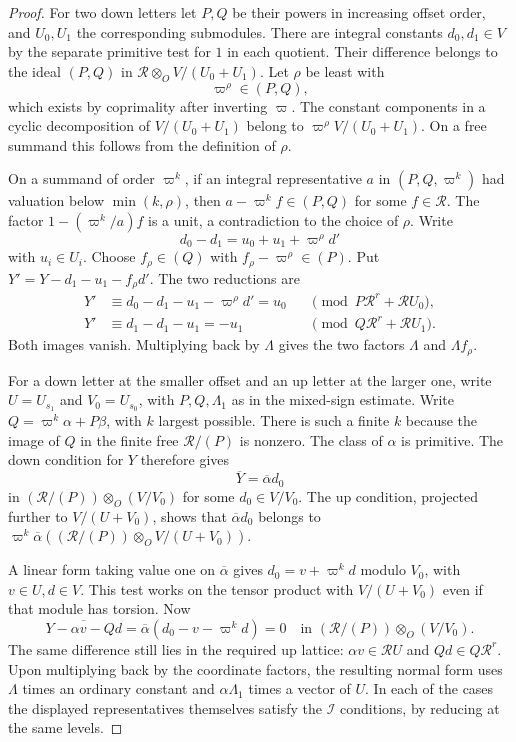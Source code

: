 \begin{proof}
For two down letters let \(P,Q\) be their powers in increasing
offset order, and \(U_0,U_1\) the corresponding submodules.
There are integral constants \(d_0,d_1\in V\) by the separate
primitive test for \(1\) in each quotient. Their difference
belongs to the ideal \((P,Q)\) in
\(\mathcal R\otimes_O V/(U_0+U_1)\). Let \(\rho\) be least with
\[
 \varpi^\rho\in(P,Q),
\]
which exists by coprimality after
inverting \(\varpi\). The constant components in a cyclic
decomposition of \(V/(U_0+U_1)\) belong to
\(\varpi^\rho V/(U_0+U_1)\). On a free summand this follows
from the definition of \(\rho\).

On a summand of order
\(\varpi^k\), if an integral representative \(a\) in
\((P,Q,\varpi^k)\) had valuation below \(\min(k,\rho)\), then
\(a-\varpi^k f\in(P,Q)\) for some \(f\in\mathcal R\).
The factor \(1-(\varpi^k/a)f\) is a unit, a contradiction
to the choice of \(\rho\).
Write
\[
 d_0-d_1=u_0+u_1+\varpi^\rho d'
\]
with
\(u_i\in U_i\). Choose \(f_\rho\in(Q)\) with
\(f_\rho-\varpi^\rho\in(P)\). Put \(Y'=Y-d_1-u_1-f_\rho d'\).
The two reductions are
\[
 \begin{aligned}
  Y'&\equiv d_0-d_1-u_1-\varpi^\rho d'=u_0
        &&\pmod {P\mathcal R^r+\mathcal R U_0},\\
  Y'&\equiv d_1-d_1-u_1=-u_1
        &&\pmod {Q\mathcal R^r+\mathcal R U_1}.
 \end{aligned}
\]
Both images vanish. Multiplying back by \(\Lambda\) gives the
two factors \(\Lambda\) and \(\Lambda f_\rho\).

For a down letter at the smaller offset and an up letter at
the larger one, write \(U=U_{s_1}\) and \(V_0=U_{s_0}\),
with \(P,Q,\Lambda_1\) as in the mixed-sign estimate. Write
\(Q=\varpi^k\alpha+P\beta\), with \(k\) largest possible.
There is such a finite \(k\) because the image of \(Q\) in
the finite free \(\mathcal R/(P)\) is nonzero. The class
of \(\alpha\) is primitive. The down condition for \(Y\)
therefore gives
\[
 \overline Y=\overline\alpha d_0
\]
in
\((\mathcal R/(P))\otimes_O(V/V_0)\) for some \(d_0\in V/V_0\).
The up condition, projected further to \(V/(U+V_0)\),
shows that \(\overline\alpha d_0\) belongs to
\(\varpi^k\overline\alpha((\mathcal R/(P))\otimes_O V/(U+V_0))\).

A linear form taking value one on \(\overline\alpha\)
gives \(d_0=v+\varpi^k d\) modulo \(V_0\), with
\(v\in U,d\in V\). This test works on the tensor product
with \(V/(U+V_0)\) even if that module has torsion. Now
\[
 \overline{Y-\alpha v-Qd}
    = \overline\alpha(d_0-v-\varpi^k d)=0
     \quad\text{in }(\mathcal R/(P))\otimes_O(V/V_0).
\]
The same difference still lies in the required up lattice:
\(\alpha v\in\mathcal R U\) and \(Qd\in Q\mathcal R^r\).
Upon multiplying back by the coordinate factors, the resulting
normal form uses \(\Lambda\) times an ordinary constant and
\(\alpha\Lambda_1\) times a vector of \(U\).
In each of the cases the displayed representatives themselves
satisfy the \(\mathcal I\) conditions, by reducing at the same
levels.


\end{proof}
